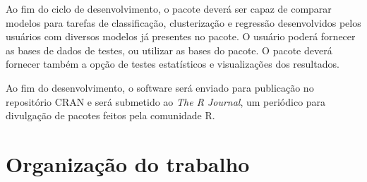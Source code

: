 Ao fim do ciclo de desenvolvimento, o pacote deverá ser capaz de comparar modelos para tarefas de classificação, clusterização e regressão desenvolvidos pelos usuários com diversos modelos já presentes no pacote.  O usuário poderá fornecer as bases de dados de testes, ou utilizar as bases do pacote. O pacote deverá fornecer também a opção de testes estatísticos e visualizações dos resultados.

Ao fim do desenvolvimento, o software será enviado para publicação no repositório CRAN e será submetido ao \textit{The R Journal}, um periódico para divulgação de pacotes feitos pela comunidade R.


\section{Organização do trabalho}
\label{sec:organizacaoTrabalho}


